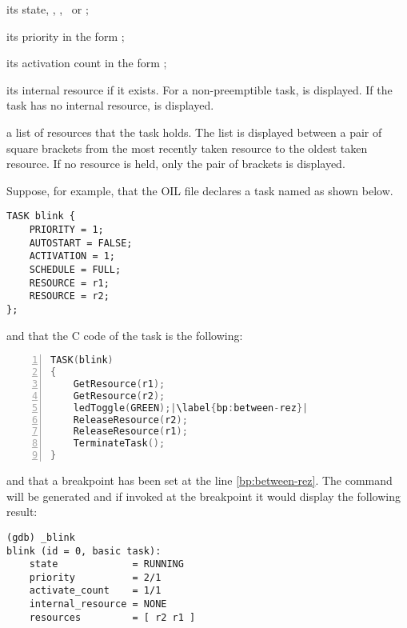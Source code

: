 \begin{pitemize}
\item its state, \SUSPENDED, \READY, \RUNNING\ or \WAITING;
\item its priority in the form ;
\item its activation count in the form ;
\item its internal resource if it exists. For a non-preemptible task,  is displayed. If the task has no internal resource,  is displayed.
\item a list of resources that the task holds. The list is displayed between a pair of square brackets from the most recently taken resource to the oldest taken resource. If no resource is held, only the pair of brackets is displayed. 
\end{pitemize}

Suppose, for example, that the OIL file declares a task named  as shown below.

\begin{lstlisting}[language=OIL]
TASK blink {
    PRIORITY = 1;
    AUTOSTART = FALSE;
    ACTIVATION = 1;
    SCHEDULE = FULL;
    RESOURCE = r1;
    RESOURCE = r2;
};
\end{lstlisting}

and that the C code of the task  is the following:

\begin{lstlisting}[language=C,escapechar=|,numbers=left]
TASK(blink)
{
    GetResource(r1);
    GetResource(r2);
    ledToggle(GREEN);|\label{bp:between-rez}|
    ReleaseResource(r2);
    ReleaseResource(r1);
    TerminateTask();
}
\end{lstlisting}
 
and that a breakpoint has been set at the line \ref{bp:between-rez}. The command  will be generated and if invoked at the breakpoint it would display the following result:

\begin{lstlisting}
(gdb) _blink 
blink (id = 0, basic task):
	state             = RUNNING
	priority          = 2/1
	activate_count    = 1/1
	internal_resource = NONE
	resources         = [ r2 r1 ]
\end{lstlisting} 


